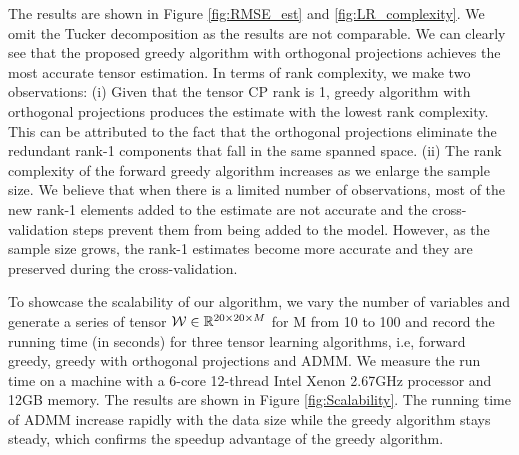 The results are shown in Figure \ref{fig:RMSE_est} and \ref{fig:LR_complexity}. We omit the Tucker decomposition as the results are not comparable. We can clearly see that the proposed greedy algorithm with orthogonal projections achieves the most accurate tensor estimation. In terms of rank complexity, we make two observations: (i) Given that the tensor CP rank is 1, greedy algorithm with orthogonal projections produces the estimate with the lowest rank complexity. This can be attributed to the fact that the orthogonal projections eliminate the redundant rank-1 components that fall in the same spanned space. (ii) The rank complexity of the forward greedy algorithm increases as we enlarge the sample size. We believe that  when there is a limited number of observations, most of the new rank-1 elements added to the estimate are not accurate and the cross-validation steps prevent them from being added to the model. However, as the sample size grows, the rank-1 estimates become more accurate and they are preserved during the cross-validation.

To showcase the scalability of our algorithm, we vary the number of variables and generate a series of tensor ${\mathcal W} \in \mathbb{R}^{20\times 20 \times M}$ for M from 10 to 100 and record the running time (in seconds) for three tensor learning algorithms, i.e, forward greedy, greedy with orthogonal projections and ADMM. We measure the run time on a machine with a 6-core 12-thread Intel Xenon 2.67GHz processor and  12GB memory. The results are shown in 
Figure \ref{fig:Scalability}. The running time of ADMM increase rapidly with the data size while the greedy algorithm stays steady,  which confirms the speedup advantage of the greedy algorithm. 
